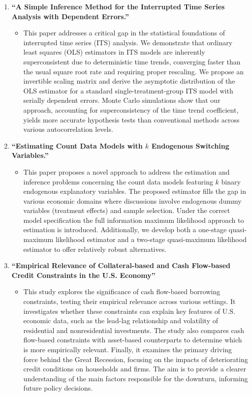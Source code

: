 \documentclass{article}
\begin{document}
\begin{enumerate}[resume]
\section*{Working in Progress}
    \item \textbf{“A Simple Inference Method for the Interrupted Time Series Analysis with Dependent Errors.”}
    \begin{itemize}
        \item[] This paper addresses a critical gap in the statistical foundations of interrupted time series (ITS) analysis. We demonstrate that ordinary least squares (OLS) estimators in ITS models are inherently superconsistent due to deterministic time trends, converging faster than the usual square root rate and requiring proper rescaling. We propose an invertible scaling matrix and derive the asymptotic distribution of the OLS estimator for a standard single-treatment-group ITS model with serially dependent errors. Monte Carlo simulations show that our approach, accounting for superconsistency of the time trend coefficient, yields more accurate hypothesis tests than conventional methods across various autocorrelation levels.
    \end{itemize}
    \item \textbf{“Estimating Count Data Models with $k$ Endogenous Switching Variables.”}
    \begin{itemize}
        \item[] This paper proposes a novel approach to address the estimation and inference problems concerning the count data models featuring $k$ binary endogenous explanatory variables. The proposed estimator fills the gap in various economic domains where discussions involve endogenous dummy variables (treatment effects) and sample selection. Under the correct model specification the full information maximum likelihood approach to estimation is introduced. Additionally, we develop both a one-stage quasi-maximum likelihood estimator and a two-stage quasi-maximum likelihood estimator to offer relatively robust alternatives. 
    \end{itemize}
    \item \textbf{“Empirical Relevance of Collateral-based and Cash Flow-based Credit Constraints in the U.S. Economy”}
    \begin{itemize}
        \item[] This study explores the significance of cash flow-based borrowing constraints, testing their empirical relevance across various settings. It investigates whether these constraints can explain key features of U.S. economic data, such as the lead-lag relationship and volatility of residential and nonresidential investments. The study also compares cash flow-based constraints with asset-based counterparts to determine which is more empirically relevant. Finally, it examines the primary driving force behind the Great Recession, focusing on the impacts of deteriorating credit conditions on households and firms. The aim is to provide a clearer understanding of the main factors responsible for the downturn, informing future policy decisions.
    \end{itemize}
\end{enumerate}
\end{document}
